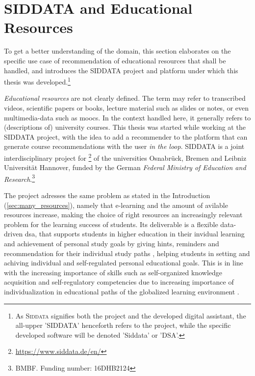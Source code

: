 


\section{SIDDATA and Educational Resources}
\label{sec:siddata}


To get a better understanding of the domain, this section elaborates on the specific use case of recommendation of educational resources that shall be handled, and introduces the SIDDATA project and platform under which this thesis was developed.\footnote{As \textsc{Siddata} signifies both the project and the developed digital assistant, the all-upper 'SIDDATA' henceforth refers to the project, while the specific developed software will be denoted 'Siddata' or 'DSA'.}

\textit{Educational resources} are not clearly defined. The term may refer to transcribed videos, scientific papers or books, lecture material such as slides or notes, or even multimedia-data such as \glspl{mooc}. In the context handled here, it generally refers to (descriptions of) university courses. This thesis was started while working at the SIDDATA project, with the idea to add a recommender to the platform that can generate course recommendations with the user \textit{in the loop}. SIDDATA is a joint interdisciplinary project for \footnote{\url{https://www.siddata.de/en/}} of the universities Osnabrück, Bremen and Leibniz Universität Hannover, funded by the German \emph{Federal Ministry of Education and Research}.\footnote{BMBF. Funding number: 16DHB2124} 

The project adresses the same problem as stated in the Introduction (\ref{sec:many_resources}), namely that e-learning and the amount of avilable resources increase, making the choice of right resources an increasingly relevant problem for the learning success of students. Its deliverable is a flexible data-driven \gls{dsa}, that supports students in higher education in their invidual learning and achievement of personal study goals by giving hints, reminders and recommendation for their individual study paths \cite{Schurz2021}, helping students in setting and achiving individual and self-regulated personal educational goals. This is in line with the increasing importance of skills such as self-organized knowledge acquisition and self-regulatory competencies due to increasing importance of individualization in educational paths of the globalized learning environment \cite{Ehlers2019,Schurz2021}.

